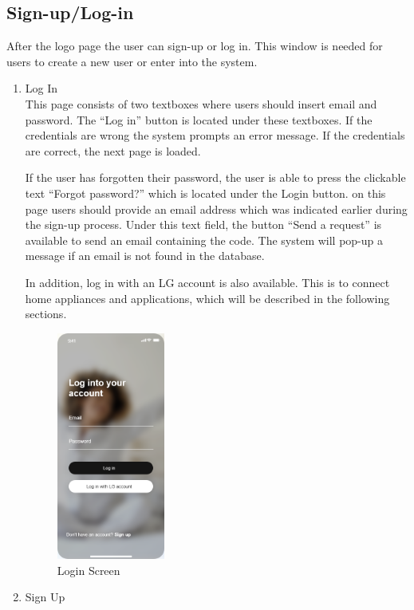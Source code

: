 \documentclass[conference]{IEEEtran}
\begin{document}
\subsection{Sign-up/Log-in}
After the logo page the user can sign-up or log in. This window is needed for users to create a new user or enter into the system.
\begin{enumerate}

    \item Log In  \\
    This page consists of two textboxes where users should insert email and password. The “Log in” button is located under these textboxes. If the credentials are wrong the system prompts an error message. If the credentials are correct, the next page is loaded. \par
    If the user has forgotten their password, the user is able to press the clickable text “Forgot password?” which is located under the Login button. on this page users should provide an email address which was indicated earlier during the sign-up process. Under this text field, the button “Send a request” is available to send an email containing the code. The system will pop-up a message if an email is not found in the database.\par
    In addition, log in with an LG account is also available. This is to connect home appliances and applications, which will be described  in the following sections.
    \begin{figure}[htbp]
        \centerline{\includegraphics[height=75mm,scale=0.5]{Images/Design_Login.png}}
        \caption{Login Screen}
        \label{fig}
    \end{figure}
    
    
    \item Sign Up  \\
    

\end{enumerate}
\end{document}
